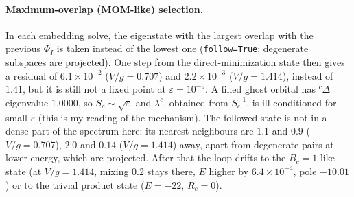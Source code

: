 \documentclass[11pt]{article}
\begin{document}
\paragraph{Maximum-overlap (MOM-like) selection.} In each embedding solve, the eigenstate with the largest overlap with the previous
$\Phi_I$ is taken instead of the lowest one (\texttt{follow=True}; degenerate subspaces are projected). One step from the direct-minimization
state then gives a residual of $6.1\times10^{-2}$ ($V/g=0.707$) and $2.2\times10^{-3}$ ($V/g=1.414$), instead of $1.41$, but it is still not a fixed point at $\varepsilon=10^{-9}$.
A filled ghost orbital has ${}^c\Delta$ eigenvalue $1.0000$, so $S_c\sim\sqrt\varepsilon$ and $\lambda^c$, obtained from $S_c^{-1}$, is ill conditioned
for small $\varepsilon$ (this is my reading of the mechanism). The followed state is not in a dense part of the spectrum here: its nearest neighbours are $1.1$ and $0.9$
($V/g=0.707$), $2.0$ and $0.14$ ($V/g=1.414$) away, apart from degenerate pairs at lower energy, which are projected.
After that the loop drifts to the $B_c=1$-like state (at $V/g=1.414$, mixing $0.2$ stays there, $E$ higher by $6.4\times10^{-4}$, pole $-10.01$) or to the trivial product state ($E=-22$, $R_c=0$).
\end{document}

